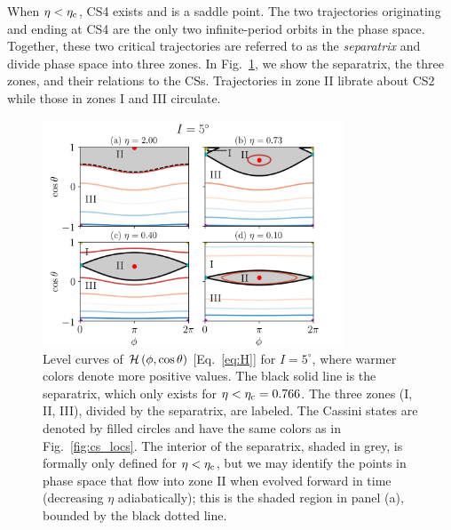 When $\eta < \eta_{\rm c}$, CS4 exists and is a saddle point. The two
trajectories originating and ending at CS4 are the only two infinite-period
orbits in the phase space. Together, these two critical trajectories are
referred to as the \emph{separatrix} and divide phase space into three zones. In
Fig.~\ref{fig:eq_1contours}, we show the separatrix, the three zones, and their
relations to the CSs. Trajectories in zone II librate about CS2 while those in
zones I and III circulate.
\begin{figure}
    \centering
    \includegraphics[width=0.8\textwidth]{plots_diskdisp/1contours_flip.png}
    \caption{Level curves of $\mathcal{H}\left(\phi, \cos \theta\right)$
    [Eq.~\eqref{eq:H}] for $I = 5^\circ$, where warmer colors denote more
    positive values. The black solid line is the separatrix, which only exists
    for $\eta < \eta_{\rm c} = 0.766$. The three zones (I, II, III), divided by
    the separatrix, are labeled. The Cassini states are denoted by filled
    circles and have the same colors as in Fig.~\ref{fig:cs_locs}. The interior
    of the separatrix, shaded in grey, is formally only defined for $\eta <
    \eta_{\rm c}$, but we may identify the points in phase space that flow into
    zone II when evolved forward in time (decreasing $\eta$ adiabatically); this
    is the shaded region in panel (a), bounded by the black dotted
    line.}\label{fig:eq_1contours}
\end{figure}

